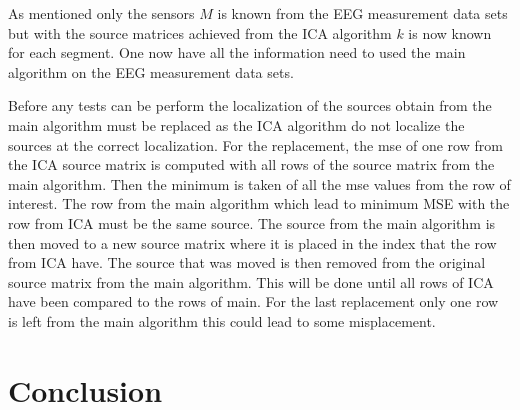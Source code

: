 As mentioned only the sensors $M$ is known from the EEG measurement data sets but with the source matrices achieved from the ICA algorithm $k$ is now known for each segment. One now have all the information need to used the main algorithm on the EEG measurement data sets. 

Before any tests can be perform the localization of the sources obtain from the main algorithm must be replaced as the ICA algorithm do not localize the sources at the correct localization. For the replacement, the mse of one row from the ICA source matrix is computed with all rows of the source matrix from the main algorithm. Then the minimum is taken of all the mse values from the row of interest. The row from the main algorithm which lead to minimum MSE with the row from ICA must be the same source. The source from the main algorithm is then moved to a new source matrix where it is placed in the index that the row from ICA have. The source that was moved is then removed from the original source matrix from the main algorithm. This will be done until all rows of ICA have been compared to the rows of main. For the last replacement only one row is left from the main algorithm this could lead to some misplacement. 




\section{Conclusion}